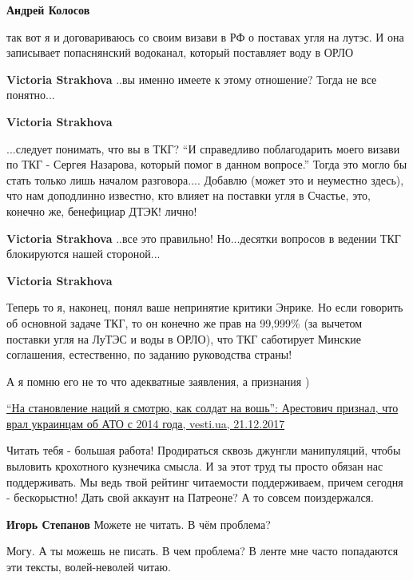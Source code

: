 \begin{itemize}
\begin{itemize}
\textbf{Андрей Колосов} 

так вот я и договариваюсь со своим визави в РФ о поставах угля на лутэс. И она
записывает попаснянский водоканал, который поставляет воду в ОРЛО

\textbf{Victoria Strakhova} ..вы именно имеете к этому отношение? Тогда не все понятно...

\textbf{Victoria Strakhova} 

...следует понимать, что вы в ТКГ? \enquote{И справедливо поблагодарить моего визави по
ТКГ - Сергея Назарова, который помог в данном вопросе.} Тогда это могло бы
стать только лишь началом разговора.... Добавлю (может это и неуместно здесь),
что нам доподлинно известно, кто влияет на поставки угля в Счастье, это,
конечно же, бенефициар ДТЭК! лично!


\textbf{Victoria Strakhova} ..все это правильно! Но...десятки вопросов в ведении ТКГ блокируются нашей стороной...

\textbf{Victoria Strakhova} 

Теперь то я, наконец, понял ваше непринятие критики Энрике. Но если говорить об
основной задаче ТКГ, то он конечно же прав на 99,999\% (за вычетом поставки угля
на ЛуТЭС и воды в ОРЛО), что ТКГ саботирует Минские соглашения, естественно, по
заданию руководства страны!

\end{itemize} %

А я помню его не то что адекватные заявления, а признания )

\href{https://vesti.ua/politika/270558-arestovich-priznal-chto-vral-ukraintsam-ob-ato-s-2014-hoda}{%
\enquote{На становление наций я смотрю, как солдат на вошь}: Арестович признал, что врал украинцам об АТО с 2014 года, %
vesti.ua, 21.12.2017%
}


Читать тебя - большая работа! Продираться сквозь джунгли манипуляций, чтобы
выловить крохотного кузнечика смысла. И за этот труд ты просто обязан нас
поддерживать. Мы ведь твой рейтинг читаемости поддерживаем, причем сегодня -
бескорыстно! Дать свой аккаунт на Патреоне? А то совсем поиздержался.

\begin{itemize} %
\textbf{Игорь Степанов} Можете не читать. В чём проблема?

Могу. А ты можешь не писать. В чем проблема? В ленте мне часто попадаются эти
тексты, волей-неволей читаю.
\end{itemize} %


\end{itemize}
